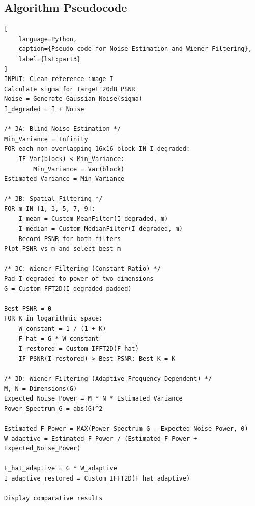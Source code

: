 \documentclass[11pt,a4paper]{article}
\begin{document}
\subsection{Algorithm Pseudocode}
\begin{lstlisting}[
    language=Python,
    caption={Pseudo-code for Noise Estimation and Wiener Filtering},
    label={lst:part3}
]
INPUT: Clean reference image I
Calculate sigma for target 20dB PSNR
Noise = Generate_Gaussian_Noise(sigma)
I_degraded = I + Noise

/* 3A: Blind Noise Estimation */
Min_Variance = Infinity
FOR each non-overlapping 16x16 block IN I_degraded:
    IF Var(block) < Min_Variance:
        Min_Variance = Var(block)
Estimated_Variance = Min_Variance

/* 3B: Spatial Filtering */
FOR m IN [1, 3, 5, 7, 9]:
    I_mean = Custom_MeanFilter(I_degraded, m)
    I_median = Custom_MedianFilter(I_degraded, m)
    Record PSNR for both filters
Plot PSNR vs m and select best m

/* 3C: Wiener Filtering (Constant Ratio) */
Pad I_degraded to power of two dimensions
G = Custom_FFT2D(I_degraded_padded)

Best_PSNR = 0
FOR K in logarithmic_space:
    W_constant = 1 / (1 + K)
    F_hat = G * W_constant
    I_restored = Custom_IFFT2D(F_hat)
    IF PSNR(I_restored) > Best_PSNR: Best_K = K

/* 3D: Wiener Filtering (Adaptive Frequency-Dependent) */
M, N = Dimensions(G)
Expected_Noise_Power = M * N * Estimated_Variance
Power_Spectrum_G = abs(G)^2

Estimated_F_Power = MAX(Power_Spectrum_G - Expected_Noise_Power, 0)
W_adaptive = Estimated_F_Power / (Estimated_F_Power + Expected_Noise_Power)

F_hat_adaptive = G * W_adaptive
I_adaptive_restored = Custom_IFFT2D(F_hat_adaptive)

Display comparative results
\end{lstlisting}
\end{document}
